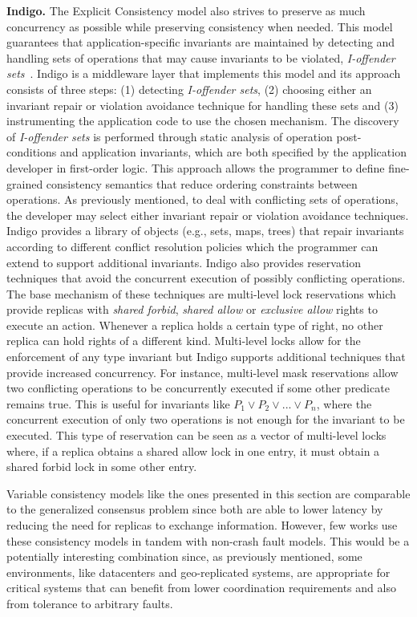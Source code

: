 \textbf{Indigo.} The Explicit Consistency model also strives to preserve as much concurrency as possible while preserving consistency when needed. This model guarantees that application-specific invariants are maintained by detecting and handling sets of operations that may cause invariants to be violated, \textit{I-offender sets}~\cite{Balegas2015}. Indigo is a middleware layer that implements this model and its approach consists of three steps: (1) detecting \textit{I-offender sets}, (2) choosing either an invariant repair or violation avoidance technique for handling these sets and (3) instrumenting the application code to use the chosen mechanism. The discovery of \textit{I-offender sets} is performed through static analysis of operation post-conditions and application invariants, which are both specified by the application developer in first-order logic. This approach allows the programmer to define fine-grained consistency semantics that reduce ordering constraints between operations. As previously mentioned, to deal with conflicting sets of operations, the developer may select either invariant repair or violation avoidance techniques. Indigo provides a library of objects (e.g., sets, maps, trees) that repair invariants according to different conflict resolution policies which the programmer can extend to support additional invariants. Indigo also provides reservation techniques that avoid the concurrent execution of possibly conflicting operations. The base mechanism of these techniques are multi-level lock reservations which provide replicas with \textit{shared forbid}, \textit{shared allow} or \textit{exclusive allow} rights to execute an action. Whenever a replica holds a certain type of right, no other replica can hold rights of a different kind. Multi-level locks allow for the enforcement of any type invariant but Indigo supports additional techniques that provide increased concurrency. For instance, multi-level mask reservations allow two conflicting operations to be concurrently executed if some other predicate remains true. This is useful for invariants like $P_1 \vee P_2 \vee ... \vee P_n$, where the concurrent execution of only two operations is not enough for the invariant to be executed. This type of reservation can be seen as a vector of multi-level locks where, if a replica obtains a shared allow lock in one entry, it must obtain a shared forbid lock in some other entry. \par
Variable consistency models like the ones presented in this section are comparable to the generalized consensus problem since both are able to lower latency by reducing the need for replicas to exchange information. However, few works use these consistency models in tandem with non-crash fault models. This would be a potentially interesting combination since, as previously mentioned, some environments, like datacenters and geo-replicated systems, are appropriate for critical systems that can benefit from lower coordination requirements and also from tolerance to arbitrary faults.

